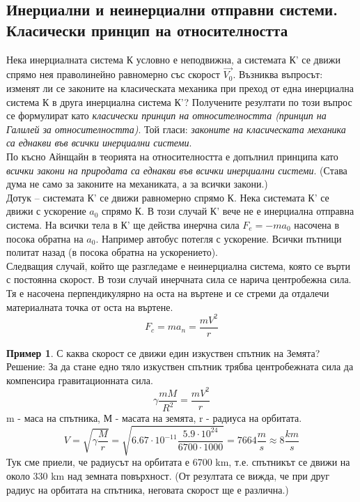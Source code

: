 \documentclass[fleqn, 12pt]{article}
\theoremstyle{definition}
\newtheorem{example}{Пример}[subsection]
\begin{document}
\subsection{Инерциални и неинерциални отправни системи. Класически принцип на относителността}
Нека инерциалната система К условно е неподвижна, а системата К' се движи спрямо нея праволинейно равномерно със скорост $\vec{V_0}$. Възниква въпросът: изменят ли се законите на класическата механика при преход от една инерциална система К в друга инерциална система К'? Получените резултати по този въпрос се формулират като \textit{класически принцип на относителността (принцип на Галилей за относителността)}. Той гласи: \textit{законите на класическата механика са еднакви във всички инерциални системи}. \\
По късно Айнщайн в теорията на относителността е допълнил принципа като \textit{всички закони на природата са еднакви във всички инерциални системи}. (Става дума не само за законите на механиката, а за всички закони.)\\
Дотук – системата К' се движи равномерно спрямо К. Нека системата К' се движи с ускорение $a_0$ спрямо К. В този случай К' вече не е инерциална отправна система. На всички тела в К' ще действа инерчна сила $F_e = -m a_0 $ насочена в посока обратна на $a_0$. Например автобус потегля с ускорение. Всички пътници политат назад (в посока обратна на ускорението). \\
Следващия случай, който ще разгледаме е неинерциална система, която се върти с постоянна скорост. В този случай инерчната сила се нарича центробежна сила. Тя е насочена перпендикулярно на оста на въртене и се стреми да отдалечи материалната точка от оста на въртене.
$$F_c = m a_n = \dfrac{mV^2}{r}$$

\begin{example}
С каква скорост се движи един изкуствен спътник на Земята?\\
Решение:  За да стане едно тяло изкуствен спътник трябва центробежната сила да компенсира
гравитационната сила.
$$\gamma \dfrac{mM}{R^2} = \dfrac{mV^2}{r}$$
m - маса на спътника, М - масата на земята, r - радиуса на орбитата. 
$$V = \sqrt{\gamma \dfrac{M}{r}} = \sqrt{6.67 \cdot 10^{-11} \dfrac{5.9 \cdot 10^{24}}{6700 \cdot 1000}} = 7664 \dfrac{m}{s} \approx 8 \dfrac{km}{s}$$
Тук сме приели, че радиусът на орбитата е 6700 km, т.е. спътникът се движи на около 330 km над земната повърхност. (От резултата се вижда, че при друг радиус на орбитата на спътника, неговата скорост ще е различна.)
\end{example}
\end{document}
